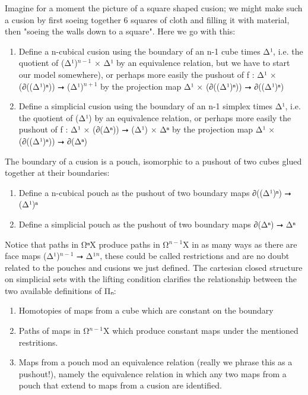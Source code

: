 \documentclass{book}
\theoremstyle{definition}
\begin{document}
Imagine for a moment the picture of a square shaped cusion; we might make such a cusion by first soeing together 6 squares of cloth and filling it with material, then "soeing the walls down to a square". Here we go with this:

\begin{enumerate}
\item Define a n-cubical cusion using the boundary of an n-1 cube times Δ¹, i.e. the quotient of (Δ¹)${}^{n-1}$ × Δ¹ by an equivalence relation, but we have to start our model somewhere), or perhaps more easily the pushout of f : Δ¹ × (∂((Δ¹)ⁿ)) ⭢ (Δ¹)${}^{n+1}$ by the projection map Δ¹ × (∂((Δ¹)ⁿ)) ⭢ ∂((Δ¹)ⁿ)
\item Define a simplicial cusion using the boundary of an n-1 simplex times Δ¹, i.e. the quotient of (Δ¹) by an equivalence relation, or perhaps more easily the pushout of f : Δ¹ × (∂(Δⁿ)) ⭢ (Δ¹) × Δⁿ by the projection map Δ¹ × (∂((Δ¹)ⁿ)) ⭢ ∂(Δⁿ)
\end{enumerate}

The boundary of a cusion is a pouch, isomorphic to a pushout of two cubes glued together at their boundaries:

\begin{enumerate}
\item Define a n-cubical pouch as the pushout of two boundary maps ∂((Δ¹)ⁿ) ⭢ (Δ¹)ⁿ
\item Define a simplicial pouch as the pushout of two boundary maps ∂(Δⁿ) ⭢ Δⁿ
\end{enumerate}

Notice that paths in Ω⃗ⁿX produce paths in Ω⃗${}^{n-1}$X in as many ways as there are face maps (Δ¹)${}^{n-1}$ ⭢ Δ¹${}^{n}$, these could be called restrictions and are no doubt related to the pouches and cusions we just defined. The cartesian closed structure on simplicial sets with the lifting condition clarifies the relationship between the two available definitions of Π⃗ₙ:

\begin{enumerate}
\item Homotopies of maps from a cube which are constant on the boundary
\item Paths of maps in Ω⃗${}^{n-1}$X which produce constant maps under the mentioned restritions.
\item Maps from a pouch mod an equivalence relation (really we phrase this as a pushout!), namely the equivalence relation in which any two maps from a pouch that extend to maps from a cusion are identified.
\end{enumerate}
\end{document}
